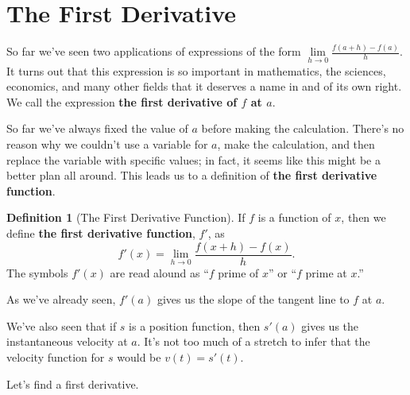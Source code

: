 \documentclass[10pt,oneside,]{book}
\newcommand{\terminology}[1]{\textbf{#1}}
\theoremstyle{plain}
\theoremstyle{definition}
\newtheorem{definition}[theorem]{Definition}
\numberwithin{equation}{section}
\newcommand{\fe}[2]{#1\mathopen{}\left(#2\right)\mathclose{}}
\newcommand{\fd}[1]{#1'}
\begin{document}
\section[The First Derivative]{The First Derivative}\label{section-first-derivative}
So far we've seen two applications of expressions of the form \(\lim\limits_{h\to0}\frac{\fe{f}{a+h}-\fe{f}{a}}{h}\). It turns out that this expression is so important in mathematics, the sciences, economics, and many other fields that it deserves a name in and of its own right. We call the expression \terminology{the first derivative of \(f\) at \(a\)}.%
\par
So far we've always fixed the value of \(a\) before making the calculation. There's no reason why we couldn't use a variable for \(a\), make the calculation, and then replace the variable with specific values; in fact, it seems like this might be a better plan all around. This leads us to a definition of \terminology{the first derivative function}.%
\begin{definition}[The First Derivative Function]\label{definition-first-derivative}
If \(f\) is a function of \(x\), then we define \terminology{the first derivative function}, \(\fd{f}\), as \[\fe{\fd{f}}{x}=\lim_{h\to0}\frac{\fe{f}{x+h}-\fe{f}{x}}{h}\text{.}\] The symbols \(\fe{\fd{f}}{x}\) are read alound as ``\(f\) prime of \(x\)'' or ``\(f\) prime at \(x\).''%
\end{definition}
\par
As we've already seen, \(\fe{\fd{f}}{a}\) gives us the slope of the tangent line to \(f\) at \(a\).%
\par
We've also seen that if \(s\) is a position function, then \(\fe{\fd{s}}{a}\) gives us the instantaneous velocity at \(a\). It's not too much of a stretch to infer that the velocity function for \(s\) would be \(\fe{v}{t}=\fe{\fd{s}}{t}\).%
\par
Let's find a first derivative.%
\end{document}
